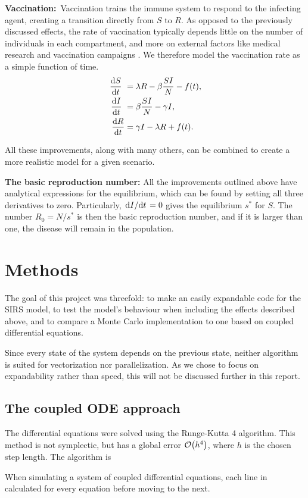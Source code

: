 \documentclass[a4paper,10pt,twocolumn]{article}
\begin{document}
\textbf{Vaccination:} Vaccination trains the immune system to respond to the infecting agent, creating a transition directly from $S$ to $R$.  As opposed to the previously discussed effects, the rate of vaccination typically depends little on the number of individuals in each compartment, and more on external factors like medical research and vaccination campaigns \cite{labtext}. 
We therefore model the vaccination rate as a simple function of time. 
\begin{subequations}
\begin{align}
\dv{S}{t} &= \lambda R - \beta\frac{SI}{N} - f(t),
\\ \dv{I}{t} &= \beta\frac{SI}{N} - \gamma I ,
\\ \dv{R}{t} &= \gamma I - \lambda R + f(t).
\end{align}
\end{subequations}

All these improvements, along with many others, can be combined to create a more realistic model for a given scenario.
 
\textbf{The basic reproduction number:}
All the improvements outlined above have analytical expressions for the equilibrium, which can be found by setting all three derivatives to zero. Particularly, $\dv*{I}{t} = 0$ gives the equilibrium $s^*$ for $S$. The number $R_0=N/s^*$ is then the basic reproduction number, and if it is larger than one, the disease will remain in the population. 
 
%
%
%
\section{Methods}

The goal of this project was threefold: to make an easily expandable code for the SIRS model,  to test the model's behaviour when including the effects described above, and to compare a Monte Carlo implementation to one based on coupled differential equations.

Since every state of the system depends on the previous state, neither algorithm is suited for vectorization nor parallelization. As we chose to focus on expandability rather than speed, this will not be discussed further in this report.  

\subsection{The coupled ODE approach}

The differential equations were solved using the Runge-Kutta 4 algorithm. This method is not symplectic, but has a global error $\order{h^4}$, where $h$ is the chosen step length. The algorithm is \cite{ODElecture}
%
\begin{algorithmic}
\EndFor
\end{algorithmic}
%
When simulating a system of coupled differential equations, each line in calculated for every equation before moving to the next. 
\end{document}
